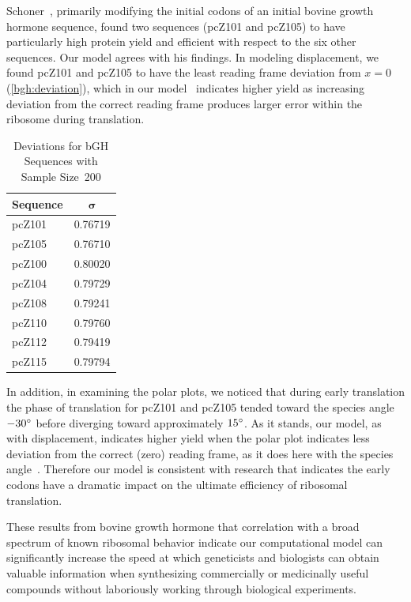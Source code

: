 \documentclass[12pt]{article}
\numberwithin{equation}{section}
\begin{document}
Schoner~\cite{schoner:bgh}, primarily modifying the initial codons of an initial
bovine growth hormone sequence, found two sequences (pcZ101 and pcZ105)
to have particularly high protein yield and efficient with respect to
the six other sequences. Our model agrees with his findings. In modeling displacement,
we found pcZ101 and pcZ105 to have the least reading frame deviation
from $x = 0$ (\autoref{bgh:deviation}), which in our model~\cite{lalit:mechanics} indicates
higher yield as increasing deviation from the correct reading frame
produces larger error within the ribosome during translation.

\begin{table}[tbp]
\begin{center}
    \begin{tabular}{lc}
        \toprule
        \textbf{Sequence} & $\mathbf{\sigma}$\\
        \midrule
        pcZ101 & 0.76719\\
        pcZ105 & 0.76710\\
        \midrule
        pcZ100 & 0.80020\\
        pcZ104 & 0.79729\\
        pcZ108 & 0.79241\\
        pcZ110 & 0.79760\\
        pcZ112 & 0.79419\\
        pcZ115 & 0.79794\\
        \bottomrule
    \end{tabular}
    \caption{Deviations for bGH Sequences with Sample Size~200}
    \label{bgh:deviation}
\end{center}
\end{table}

In addition, in examining the polar plots, we noticed that during
early translation the phase of translation for pcZ101 and pcZ105 tended toward the species
angle $-30^\circ$ before diverging toward approximately $15^\circ$. As
it stands, our model, as with displacement, indicates higher yield when the polar plot
indicates less deviation from the correct (zero) reading frame, as it
does here with the species angle~\cite{lalit:mechanics}. Therefore our
model is consistent with research that indicates
the early codons have a dramatic impact on the ultimate efficiency of
ribosomal translation.

These results from bovine growth hormone that correlation with a broad
spectrum of known ribosomal behavior indicate our computational model
can significantly increase the speed at which geneticists and
biologists can obtain valuable information when synthesizing
commercially or medicinally useful compounds without laboriously
working through biological experiments.
\end{document}
